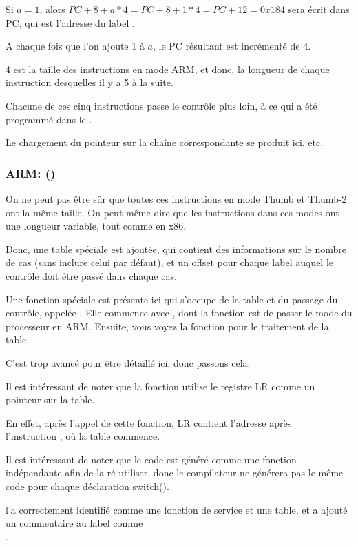 Si $a=1$, alors $PC+8+a*4 = PC+8+1*4 = PC+12 = 0x184$ sera écrit dans \ac{PC}, qui
est l'adresse du label .

A chaque fois que l'on ajoute 1 à $a$, le \ac{PC} résultant est incrémenté de
4.

4 est la taille des instructions en mode ARM, et donc, la longueur de chaque instruction
 desquelles il y a 5 à la suite.

Chacune de ces cinq instructions  passe le contrôle plus loin, à ce qui a
été programmé dans le .

Le chargement du pointeur sur la chaîne correspondante se produit ici, etc.

\subsubsection{ARM: \OptimizingKeilVI (\ThumbMode)}




On ne peut pas être sûr que toutes ces instructions en mode Thumb et Thumb-2 ont
la même taille. On peut même dire que les instructions dans ces modes ont une longueur
variable, tout comme en x86.


Donc, une table spéciale est ajoutée, qui contient des informations sur le nombre
de cas (sans inclure celui par défaut), et un offset pour chaque label auquel le
contrôle doit être passé dans chaque cas.


Une fonction spéciale est présente ici qui s'occupe de la table et du passage du
contrôle, appelée .
Elle commence avec , dont la fonction est de passer le mode du processeur
en ARM.
Ensuite, vous voyez la fonction pour le traitement de la table.

C'est trop avancé pour être détaillé ici, donc passons cela.


Il est intéressant de noter que la fonction utilise le registre \ac{LR} comme un
pointeur sur la table.

En effet, après l'appel de cette fonction, \ac{LR} contient l'adresse après\\
l'instruction , où la table commence.

Il est intéressant de noter que le code est généré comme une fonction indépendante
afin de la ré-utiliser, donc le compilateur ne générera pas le même code pour chaque
déclaration switch().

\IDA l'a correctement identifié comme une fonction de service et une table, et a
ajouté un commentaire au label comme\\
.

